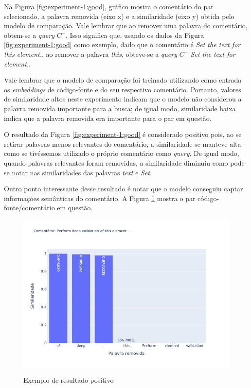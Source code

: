 Na Figura \ref{fig:experiment-1:good}, gráfico mostra o comentário do par selecionado, a palavra removida (eixo x) e a similaridade (eixo y) obtida pelo modelo de comparação. Vale lembrar que ao remover uma palavra do comentário, obtem-se a \textit{query} $C^-$. Isso significa que, usando os dados da Figura \ref{fig:experiment-1:good} como exemplo, dado que o comentário é \textit{Set the text for this element.}, ao remover a palavra \textit{this}, obteve-se a \textit{query} $C^-$ \textit{Set the text for element.}.

Vale lembrar que o modelo de comparação foi treinado utilizando como entrada os \textit{embeddings} de código-fonte e do seu respectivo comentário. Portanto, valores de similaridade altos neste experimento indicam que o modelo não considerou a palavra removida importante para a busca; de igual modo, similaridade baixa indica que a palavra removida era importante para o par em questão.

O resultado da Figura \ref{fig:experiment-1:good} é considerado positivo pois, ao se retirar palavras menos relevantes do comentário, a similaridade se manteve alta - como se tivéssemos utilizado o próprio comentário como \textit{query}. De igual modo, quando palavras relevantes foram removidas, a similaridade diminuiu como pode-se notar nas similaridades das palavras \textit{text} e \textit{Set}.

Outro ponto interessante desse resultado é notar que o modelo conseguiu captar informações semânticas do comentário. A Figura \ref{fig:experiment-1-medium} mostra o par código-fonte/comentário em questão.

\begin{figure}[H]
  \centering
    \caption{Exemplo de resultado positivo}
    \includegraphics[scale=0.6]{imagens/resultados/experiment-1/sample_9.png}
  \label{fig:experiment-1-medium}
\end{figure}

